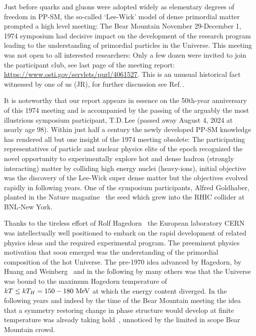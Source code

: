  Just before quarks and gluons were adopted widely as elementary degrees of freedom in PP-SM, the so-called `Lee-Wick' model of dense primordial matter prompted a high level meeting: The Bear Mountain November 29-December 1, 1974 symposium had decisive impact on the development of the research program leading to the understanding of primordial particles in the Universe. This meeting was not open to all interested researchers: Only a few dozen were invited to join the participant club, see last page of the meeting report: \url{https://www.osti.gov/servlets/purl/4061527}. This is an unusual historical fact witnessed by one of us (JR), for further discussion see Ref.\,\cite{Rafelski:2019twp}.

It is noteworthy that our report appears in essence on the 50th-year anniversary of this 1974 meeting and is accompanied by the passing of the arguably the most illustrious symposium participant, T.D.\,Lee (passed away August 4, 2024 at nearly age 98). Within just half a century the newly developed PP-SM knowledge has rendered all but one insight of the 1974 meeting obsolete: The participating representatives of particle and nuclear physics elite of the epoch recognized the novel opportunity to experimentally explore hot and dense hadron (strongly interacting) matter by colliding high energy nuclei (heavy-ions), initial objective was the discovery of the Lee-Wick super dense matter but the objectives evolved rapidly in following years. One of the symposium participants, Alfred Goldhaber, planted in the Nature magazine~\cite{Goldhaber:1978qp} the seed which grew into the RHIC collider at BNL-New York. 

 Thanks to the tireless effort of Rolf Hagedorn~\cite{Rafelski:2016hnq} the European laboratory CERN was intellectually well positioned to embark on the rapid development of related physics ideas and the required experimental program. The preeminent physics motivation that soon emerged was the understanding of the primordial composition of the hot Universe. The pre-1970 idea advanced by Hagedorn, by Huang and Weinberg~\cite{Huang:1970iq} and in the following by many others was that the Universe was bound to the maximum Hagedorn temperature of $kT\le kT_H=150-180\text{ MeV}$ at which the energy content diverged. In the following years and indeed by the time of the Bear Mountain meeting the idea that a symmetry restoring change in phase structure would develop at finite temperature was already taking hold~\cite{Weinberg:1974hy,Harrington:1974fc}, unnoticed by the limited in scope Bear Mountain crowd.

